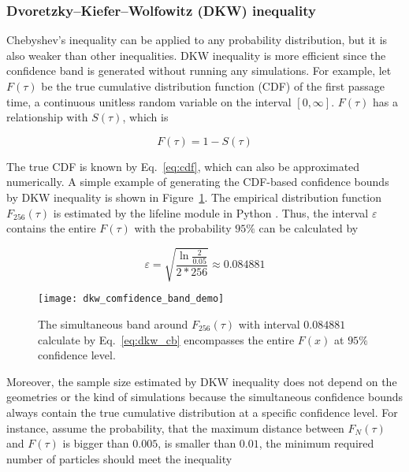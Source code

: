 \subsubsection{Dvoretzky–Kiefer–Wolfowitz (DKW) inequality}

Chebyshev's inequality can be applied to any probability distribution,
but it is also weaker than other inequalities. DKW inequality is more
efficient since the confidence band is generated without running any
simulations. For example, let $F(\tau)$ be the true cumulative
distribution function (CDF) of the first passage time, a continuous unitless
random variable on the interval $[0, \infty]$. $F(\tau)$ has a
relationship with $S(\tau)$, which is

\begin{equation}\label{eq:cdf}
  F(\tau) = 1 - S(\tau)
\end{equation}

The true CDF is known by Eq.~\ref{eq:cdf}, which can also be approximated
numerically. A simple example of generating the CDF-based confidence
bounds by DKW inequality is shown in Figure~\ref{fig:dkw_cb_sample}. The empirical
distribution function $F_{256}(\tau)$ is estimated by the lifeline
module in Python \cite{davidson2019lifelines}. Thus, the interval
$\varepsilon$ contains the entire $F(\tau)$ with the probability
$95\%$ can be calculated by 

\begin{equation}\label{eq:dkw_cb}
  \varepsilon = \sqrt{\frac{\ln{\frac{2}{0.05}}}{2* 256}} \approx 0.084881
\end{equation}

\begin{figure}
  \centering
  \texttt{[image: dkw\_comfidence\_band\_demo]}
  \caption{The simultaneous band around $F_{256}(\tau)$ with interval
    $0.084881$ calculate by Eq.~\ref{eq:dkw_cb} encompasses
    the entire $F(x)$ at $95\%$ confidence level. \label{fig:dkw_cb_sample}}
\end{figure}



Moreover, the sample size estimated by DKW inequality  does
not depend on the geometries or the kind of simulations because the
simultaneous confidence bounds always contain the true cumulative
distribution at a specific confidence level. For instance, assume the
probability, that the maximum distance between $F_N(\tau)$ and
$F(\tau)$ is bigger than $0.005$, is smaller than $0.01$, the minimum
required number of particles should meet the inequality

